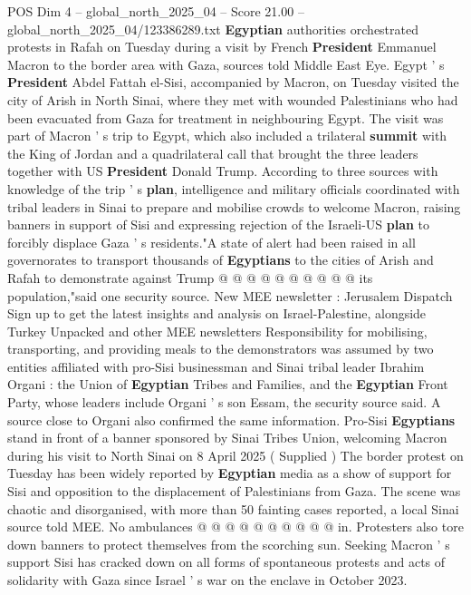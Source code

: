 \begin{textsample}{POS Dim 4 – global\_north\_2025\_04 – Score 21.00 – global\_north\_2025\_04/123386289.txt}  \label{ex:f4_pos_228}
\textbf{Egyptian} authorities orchestrated protests in Rafah on Tuesday during a visit by French \textbf{President} Emmanuel Macron to the border area with Gaza, sources told Middle East Eye.
Egypt ' s \textbf{President} Abdel Fattah el-Sisi, accompanied by Macron, on Tuesday visited the city of Arish in North Sinai, where they met with wounded Palestinians who had been evacuated from Gaza for treatment in neighbouring Egypt.
The visit was part of Macron ' s trip to Egypt, which also included a trilateral \textbf{summit} with the King of Jordan and a quadrilateral call that brought the three leaders together with US \textbf{President} Donald Trump.
According to three sources with knowledge of the trip ' s \textbf{plan}, intelligence and military officials coordinated with tribal leaders in Sinai to prepare and mobilise crowds to welcome Macron, raising banners in support of Sisi and expressing rejection of the Israeli-US \textbf{plan} to forcibly displace Gaza ' s residents."A state of alert had been raised in all governorates to transport thousands of \textbf{Egyptians} to the cities of Arish and Rafah to demonstrate against Trump @ @ @ @ @ @ @ @ @ @ its population,"said one security source.
New MEE newsletter : Jerusalem Dispatch Sign up to get the latest insights and analysis on Israel-Palestine, alongside Turkey Unpacked and other MEE newsletters Responsibility for mobilising, transporting, and providing meals to the demonstrators was assumed by two entities affiliated with pro-Sisi businessman and Sinai tribal leader Ibrahim Organi : the Union of \textbf{Egyptian} Tribes and Families, and the \textbf{Egyptian} Front Party, whose leaders include Organi ' s son Essam, the security source said.
A source close to Organi also confirmed the same information.
Pro-Sisi \textbf{Egyptians} stand in front of a banner sponsored by Sinai Tribes Union, welcoming Macron during his visit to North Sinai on 8 April 2025 ( Supplied ) The border protest on Tuesday has been widely reported by \textbf{Egyptian} media as a show of support for Sisi and opposition to the displacement of Palestinians from Gaza.
The scene was chaotic and disorganised, with more than 50 fainting cases reported, a local Sinai source told MEE.
No ambulances @ @ @ @ @ @ @ @ @ @ in.
Protesters also tore down banners to protect themselves from the scorching sun.
Seeking Macron ' s support Sisi has cracked down on all forms of spontaneous protests and acts of solidarity with Gaza since Israel ' s war on the enclave in October 2023.

\end{textsample}
